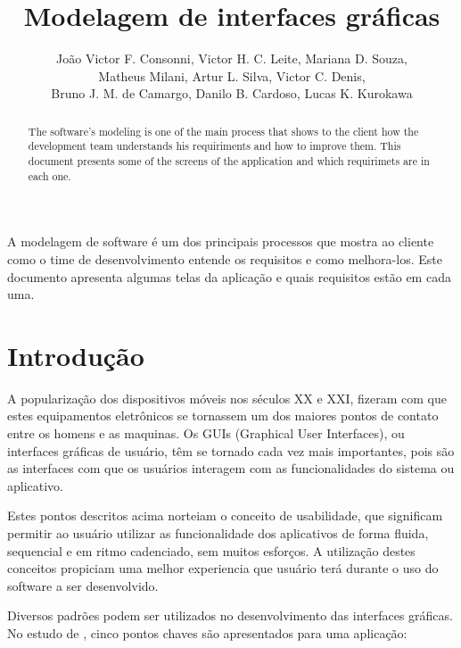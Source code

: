 \documentclass[12pt]{article}
\title{Modelagem de interfaces gráficas}
\author{João Victor F. Consonni\inst{1}, Victor H. C. Leite\inst{1}, Mariana D. Souza\inst{1}, \\Matheus Milani\inst{1}, Artur L. Silva\inst{1}, Victor C. Denis\inst{1}, \\Bruno J. M. de Camargo\inst{1}, Danilo B. Cardoso\inst{1}, Lucas K. Kurokawa\inst{1}}
\begin{document}
 

\maketitle

\begin{abstract} 
 The software's modeling is one of the main process that shows to the client how the development team understands his requiriments and how to improve them. This document presents some of the screens of the application and which requirimets are in each one.
\end{abstract}

\begin{resumo} 
A modelagem de software é um dos principais processos que mostra ao cliente como o time de desenvolvimento entende os requisitos e como melhora-los. Este documento apresenta algumas telas da aplicação e quais requisitos estão em cada uma.
\end{resumo}

\newpage
\tableofcontents   
\newpage

\section{Introdução}
A popularização dos dispositivos móveis nos séculos XX e XXI, fizeram com que estes equipamentos eletrônicos se tornassem um dos maiores pontos de contato entre os homens e as maquinas. Os GUIs (Graphical User Interfaces), ou interfaces gráficas de usuário, têm se tornado cada vez mais importantes, pois são as interfaces com que os usuários interagem com as funcionalidades do sistema ou aplicativo.


Estes pontos descritos acima norteiam o conceito de usabilidade, que significam permitir ao usuário utilizar as funcionalidade dos aplicativos de forma fluida, sequencial e em ritmo cadenciado, sem muitos esforços. A utilização destes conceitos propiciam uma melhor experiencia que usuário terá durante o uso do software a ser desenvolvido.  

Diversos padrões podem ser utilizados no desenvolvimento das interfaces gráficas. No estudo de \cite{nielsen1993iterative}, cinco pontos chaves são apresentados para uma aplicação:
\end{document}
